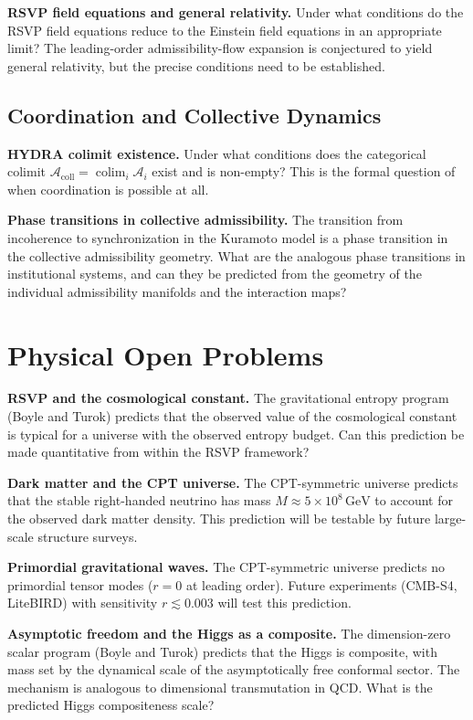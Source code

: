 \documentclass[12pt,a4paper]{book}
\theoremstyle{remark}
\theoremstyle{definition}
\begin{document}
\textbf{RSVP field equations and general relativity.} Under what
conditions do the RSVP field equations reduce to the Einstein field
equations in an appropriate limit? The leading-order admissibility-flow
expansion is conjectured to yield general relativity, but the precise
conditions need to be established.

\subsection*{Coordination and Collective Dynamics}

\textbf{HYDRA colimit existence.} Under what conditions does the
categorical colimit $\mathcal{A}_{\mathrm{coll}} = \operatorname{colim}_i
\mathcal{A}_i$ exist and is non-empty? This is the formal question of
when coordination is possible at all.

\textbf{Phase transitions in collective admissibility.} The transition
from incoherence to synchronization in the Kuramoto model is a phase
transition in the collective admissibility geometry. What are the
analogous phase transitions in institutional systems, and can they be
predicted from the geometry of the individual admissibility manifolds
and the interaction maps?

\section{Physical Open Problems}

\textbf{RSVP and the cosmological constant.} The gravitational entropy
program (Boyle and Turok) predicts that the observed value of the
cosmological constant is typical for a universe with the observed
entropy budget. Can this prediction be made quantitative from within
the RSVP framework?

\textbf{Dark matter and the CPT universe.} The CPT-symmetric universe
predicts that the stable right-handed neutrino has mass
$M \approx 5 \times 10^8\,\mathrm{GeV}$ to account for the observed
dark matter density. This prediction will be testable by future
large-scale structure surveys.

\textbf{Primordial gravitational waves.} The CPT-symmetric universe
predicts no primordial tensor modes ($r = 0$ at leading order). Future
experiments (CMB-S4, LiteBIRD) with sensitivity $r \lesssim 0.003$
will test this prediction.

\textbf{Asymptotic freedom and the Higgs as a composite.} The
dimension-zero scalar program (Boyle and Turok) predicts that the Higgs
is composite, with mass set by the dynamical scale of the asymptotically
free conformal sector. The mechanism is analogous to dimensional
transmutation in QCD. What is the predicted Higgs compositeness scale?
\end{document}
